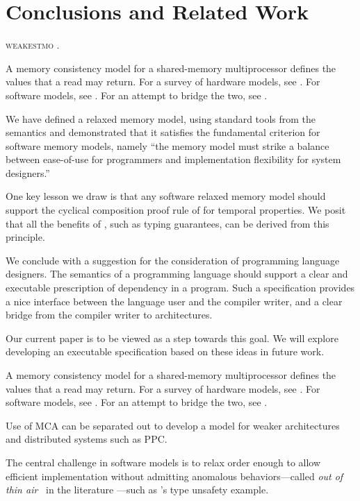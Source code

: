 \section{Conclusions and Related Work}\label{sec:ldrf}
\textsc{weakestmo} \cite{DBLP:journals/pacmpl/ChakrabortyV19, DBLP:journals/corr/abs-1911-06567}.

A memory consistency model for a shared-memory multiprocessor defines the
values that a read may return.  For a survey of hardware models, see
\citep{AlglaveThesis}. For software models, see
\citep{DBLP:journals/toplas/Lochbihler13,DBLP:phd/ethos/Batty15}.  For an
attempt to bridge the two, see \citep{DBLP:journals/pacmpl/PodkopaevLV19}.

We have defined a relaxed memory model, using standard tools from the
semantics and demonstrated that it satisfies the fundamental criterion for
software memory models, namely ``the memory model must strike a balance
between ease-of-use for programmers and implementation flexibility for system
designers.''

One key lesson we draw is that any software relaxed memory model should
support the cyclical composition proof rule of
\citet{Abadi:1993:CS:151646.151649} for temporal properties.  We posit that all
the benefits of \oota, such as typing guarantees, can be derived from this
principle. 

We conclude with a suggestion for the consideration of programming language
designers.  The semantics of a programming language should support a clear
and executable prescription of dependency in a program.  Such a specification
provides a nice interface between the language user and the compiler writer,
and a clear bridge from the compiler writer to architectures.

Our current paper is to be viewed as a step towards this goal.  We will
explore developing an executable specification based on these ideas in future
work.

A memory consistency model for a shared-memory multiprocessor defines the
values that a read may return.  For a survey of hardware models, see
\citep{AlglaveThesis}. For software models, see
\citep{DBLP:journals/toplas/Lochbihler13,DBLP:phd/ethos/Batty15}.  For an
attempt to bridge the two, see \citep{DBLP:journals/pacmpl/PodkopaevLV19}.

Use of MCA can be separated out to develop a model for weaker architectures
and distributed systems such as PPC.

The central challenge in software models is to relax order enough to allow
efficient implementation without admitting anomalous behaviors---called
\emph{out of thin air} \oota\ in the literature
\cite{DBLP:conf/esop/BattyMNPS15,BoehmOOTA}---such as
\citeauthor{DBLP:journals/toplas/Lochbihler13}'s type unsafety example.

